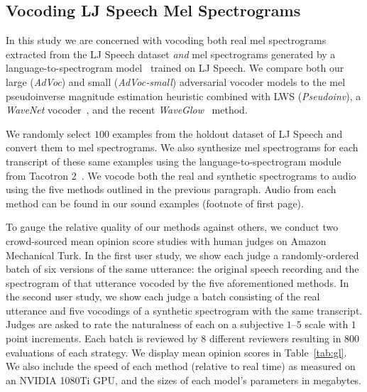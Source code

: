 \documentclass[a4paper]{article}
\begin{document}
\subsection{Vocoding LJ Speech Mel Spectrograms}

In this study we are concerned with vocoding both real mel spectrograms extracted from the LJ Speech dataset
\emph{and} mel spectrograms generated by a language-to-spectrogram model~\cite{shen2018natural} trained on LJ Speech. 
We compare both our large (\emph{AdVoc}) and small (\emph{AdVoc-small}) adversarial vocoder models to 
the mel pseudoinverse magnitude estimation heuristic combined with LWS (\emph{Pseudoinv}),
a \emph{WaveNet} vocoder~\cite{shen2018natural}, 
and the recent \emph{WaveGlow}~\cite{waveglow} method.

We randomly select $100$ examples from the holdout dataset of LJ Speech and convert them to mel spectrograms. 
We also synthesize mel spectrograms for each transcript of these same examples using the language-to-spectrogram module from Tacotron 2~\cite{shen2018natural}.
We vocode both the real and synthetic spectrograms to audio using the five methods outlined in the previous paragraph. 
Audio from each method can be found in our sound examples (footnote of first page).

To gauge the relative quality of our methods against others,
we conduct two crowd-sourced mean opinion score studies with human judges on Amazon Mechanical Turk. 
In the first user study, 
we show each judge a randomly-ordered batch of six versions of the same utterance: the original speech recording and the spectrogram of that utterance vocoded by the five aforementioned methods. 
In the second user study, 
we show each judge a batch consisting of the real utterance and five vocodings of a synthetic spectrogram with the same transcript.
Judges are asked to rate the naturalness of each on a subjective $1$--$5$ scale with $1$ point increments. 
Each batch is reviewed by $8$ different reviewers resulting in $800$ evaluations of each strategy.
We display 
mean opinion scores
in Table~\ref{tab:gl}. 
We also include the speed of each method (relative to real time) as measured on an NVIDIA 1080Ti GPU, and the sizes of each model's parameters in megabytes. 

\end{document}
